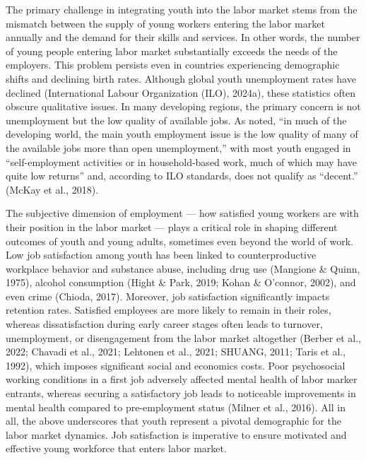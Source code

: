 \documentclass[
]{interact}
\begin{document}
The primary challenge in integrating youth into the labor market stems
from the mismatch between the supply of young workers entering the labor
market annually and the demand for their skills and services. In other
words, the number of young people entering labor market substantially
exceeds the needs of the employers. This problem persists even in
countries experiencing demographic shifts and declining birth rates.
Although global youth unemployment rates have declined (International
Labour Organization (ILO), 2024a), these statistics often obscure
qualitative issues. In many developing regions, the primary concern is
not unemployment but the low quality of available jobs. As noted, ``in
much of the developing world, the main youth employment issue is the low
quality of many of the available jobs more than open unemployment,''
with most youth engaged in ``self-employment activities or in
household-based work, much of which may have quite low returns'' and,
according to ILO standards, does not qualify as ``decent.'' (McKay et
al., 2018).

The subjective dimension of employment --- how satisfied young workers
are with their position in the labor market --- plays a critical role in
shaping different outcomes of youth and young adults, sometimes even
beyond the world of work. Low job satisfaction among youth has been
linked to counterproductive workplace behavior and substance abuse,
including drug use (Mangione \& Quinn, 1975), alcohol consumption (Hight
\& Park, 2019; Kohan \& O'connor, 2002), and even crime (Chioda, 2017).
Moreover, job satisfaction significantly impacts retention rates.
Satisfied employees are more likely to remain in their roles, whereas
dissatisfaction during early career stages often leads to turnover,
unemployment, or disengagement from the labor market altogether (Berber
et al., 2022; Chavadi et al., 2021; Lehtonen et al., 2021; SHUANG, 2011;
Taris et al., 1992), which imposes significant social and economics
costs. Poor psychosocial working conditions in a first job adversely
affected mental health of labor marker entrants, whereas securing a
satisfactory job leads to noticeable improvements in mental health
compared to pre-employment status (Milner et al., 2016). All in all, the
above underscores that youth represent a pivotal demographic for the
labor market dynamics. Job satisfaction is imperative to ensure
motivated and effective young workforce that enters labor market.
\end{document}
